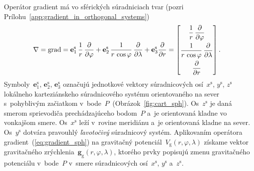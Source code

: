 \documentclass[a4paper, 12pt]{book}
\newcommand{\grad}{\mathrm{grad}}
\newcommand{\gidx}{\mathrm g}
\let\vec\mathbf
\begin{document}
Operátor gradient má vo sférických súradniciach tvar (pozri 
Prílohu~\ref{app:gradient_in_orthogonal_systems})
%
\begin{equation}
\label{eq:gradient_sph}
\nabla = \grad = \vec e_1^\mathrm{s} \, \frac{1}{r} \, \frac{\partial}{\partial 
\varphi} + \vec e_2^\mathrm{s} \, \frac{1}{r \, \cos\varphi} \, 
\frac{\partial}{\partial \lambda} + \vec e_3^\mathrm{s} 
\frac{\partial}{\partial r}\\
%
=
%
\begin{bmatrix}
\dfrac{1}{r} \, \dfrac{\partial}{\partial \varphi} \\[2ex]
\dfrac{1}{r \, \cos\varphi} \, \dfrac{\partial}{\partial \lambda}\\[2ex]
\dfrac{\partial}{\partial r}
\end{bmatrix}
{.}
\end{equation}
%
Symboly~$\vec{e}_1^\mathrm{s}$, $\vec{e}_2^{\mathrm{s}}$, 
$\vec{e}_3^\mathrm{s}$ označujú jednotkové vektory súradnicových 
osí~$x^\mathrm{s}$, $y^\mathrm{s}$, $z^\mathrm{s}$ lokálneho karteziánskeho 
súradnicového systému orientovaného na sever s~pohyblivým začiatkom 
v~bode~$P$~(Obrázok~\ref{fig:cart_sph}).  Os~$z^\mathrm{s}$ je daná smerom 
sprievodiča prechádzajúceho bodom~$P$ a~je orientovaná kladne vo vonkajšom 
smere.  Os~$x^\mathrm{s}$ leží v~rovine meridiánu a~je orientovaná kladne na 
sever.  Os~$y^\mathrm{s}$ dotvára pravouhlý \emph{ľavotočivý} súradnicový 
systém.  Aplikovaním operátora gradient~(\ref{eq:gradient_sph}) na gravitačný 
potenciál~$V_\gidx(r, \varphi, \lambda)$ získame vektor gravitačného 
zrýchlenia~$\vec g_\gidx(r, \varphi, \lambda)$, ktorého prvky popisujú zmenu 
gravitačného potenciálu v~bode~$P$ v~smere súradnicových osí~$x^\mathrm{s}$, 
$y^\mathrm{s}$ a~$z^\mathrm{s}$.
\end{document}
